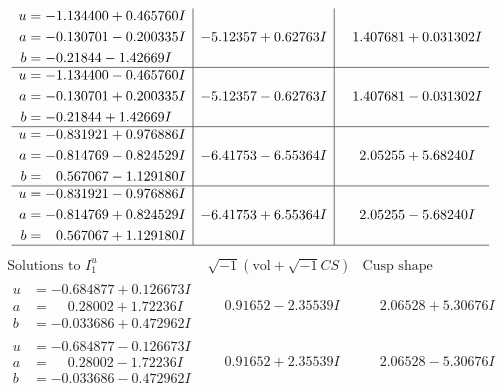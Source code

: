 \documentclass[1p]{elsarticle_modified}
\theoremstyle{definition}
\newcommand{\I}{\sqrt{-1}}
\begin{document}
$$\begin{array}{c|c|c}
\begin{aligned}
u &= -1.134400 + 0.465760 I \\
a &= -0.130701 - 0.200335 I \\
b &= -0.21844 - 1.42669 I\end{aligned}
 & -5.12357 + 0.62763 I & \phantom{-}1.407681 + 0.031302 I \\ \hline\begin{aligned}
u &= -1.134400 - 0.465760 I \\
a &= -0.130701 + 0.200335 I \\
b &= -0.21844 + 1.42669 I\end{aligned}
 & -5.12357 - 0.62763 I & \phantom{-}1.407681 - 0.031302 I \\ \hline\begin{aligned}
u &= -0.831921 + 0.976886 I \\
a &= -0.814769 - 0.824529 I \\
b &= \phantom{-}0.567067 - 1.129180 I\end{aligned}
 & -6.41753 - 6.55364 I & \phantom{-}2.05255 + 5.68240 I \\ \hline\begin{aligned}
u &= -0.831921 - 0.976886 I \\
a &= -0.814769 + 0.824529 I \\
b &= \phantom{-}0.567067 + 1.129180 I\end{aligned}
 & -6.41753 + 6.55364 I & \phantom{-}2.05255 - 5.68240 I\\
 \hline 
 \end{array}$$\newpage$$\begin{array}{c|c|c}  
\text{Solutions to }I^u_{1}& \I (\text{vol} + \sqrt{-1}CS) & \text{Cusp shape}\\
 \hline 
\begin{aligned}
u &= -0.684877 + 0.126673 I \\
a &= \phantom{-}0.28002 + 1.72236 I \\
b &= -0.033686 + 0.472962 I\end{aligned}
 & \phantom{-}0.91652 - 2.35539 I & \phantom{-}2.06528 + 5.30676 I \\ \hline\begin{aligned}
u &= -0.684877 - 0.126673 I \\
a &= \phantom{-}0.28002 - 1.72236 I \\
b &= -0.033686 - 0.472962 I\end{aligned}
 & \phantom{-}0.91652 + 2.35539 I & \phantom{-}2.06528 - 5.30676 I \\ \hline\begin{aligned}

\end{aligned}
\end{array}$$
\end{document}
